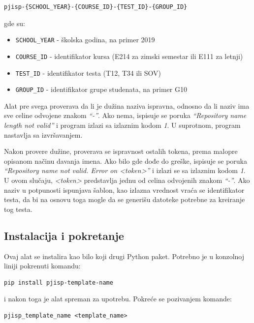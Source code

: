\documentclass[12pt]{report}
\begin{document}
\begin{verbatim}
pjisp-{SCHOOL_YEAR}-{COURSE_ID}-{TEST_ID}-{GROUP_ID}
\end{verbatim}

gde su:

\begin{itemize}
    \item \texttt{{SCHOOL\_YEAR}} - školska godina, na primer 2019
    \item \texttt{{COURSE\_ID}} - identifikator kursa (E214 za zimski semestar ili E111 za letnji)
    \item \texttt{{TEST\_ID}} - identifikator testa (T12, T34 ili SOV)
    \item \texttt{{GROUP\_ID}} - identifikator grupe studenata, na primer G10
\end{itemize}

Alat pre svega proverava da li je dužina naziva ispravna, odnosno da li naziv ima sve celine odvojene znakom \textit{``-''}. Ako nema, ispisuje se poruka \textit{``Repository name length not valid''} i program izlazi sa izlaznim kodom \textit{1}. U suprotnom, program nastavlja sa izvršavanjem.

Nakon provere dužine, proverava se ispravnost ostalih tokena, prema malopre opisanom načinu davanja imena. Ako bilo gde dođe do greške, ispisuje se poruka  \textit{``Repository name not valid. Error on <token>''} i izlazi se sa izlaznim kodom \textit{1}. U ovom slučaju, \textit{<token>} predstavlja jednu od celina odvojenih znakom \textit{``-''}. Ako naziv u potpunosti ispunjava šablon, kao izlazna vrednost vraća se identifikator testa, da bi na osnovu toga mogle da se generišu datoteke potrebne za kreiranje tog testa.

\subsection{Instalacija i pokretanje}
Ovaj alat se instalira kao bilo koji drugi Python paket. Potrebno je u konzolnoj liniji pokrenuti komandu:

\begin{verbatim}
pip install pjisp-template-name
\end{verbatim}

i nakon toga je alat spreman za upotrebu. Pokreće se pozivanjem komande:

\begin{verbatim}
pjisp_template_name <template_name>
\end{verbatim}
\end{document}
